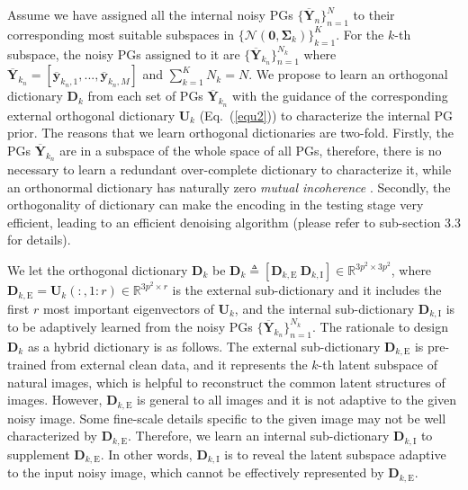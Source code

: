 \documentclass[10pt,twocolumn,letterpaper]{article}
\begin{document}
Assume we have assigned all the internal noisy PGs $\{\mathbf{\overline{Y}}_{n}\}_{n=1}^{N}$ to their corresponding most suitable subspaces in $\{\mathcal{N}(\mathbf{0},\mathbf{\Sigma}_{k})\}_{k=1}^{K}$. For the $k$-th subspace, the noisy PGs assigned to it are $\{\mathbf{\overline{Y}}_{k_{n}}\}_{n=1}^{N_{k}}$ where $\mathbf{\overline{Y}}_{k_{n}}=[\mathbf{\overline{y}}_{k_{n},1},...,\mathbf{\overline{y}}_{k_{n},M}]$ and $\sum_{k=1}^{K}N_{k}=N$. We propose to learn an orthogonal dictionary $\mathbf{D}_{k}$ from each set of PGs $\mathbf{\overline{Y}}_{k_{n}}$ with the guidance of the corresponding external orthogonal dictionary $\mathbf{U}_{k}$ (Eq.\ (\ref{equ2})) to characterize the internal PG prior. The reasons that we learn orthogonal dictionaries are two-fold. Firstly, the PGs $\mathbf{\overline{Y}}_{k_{n}}$ are in a subspace of the whole space of all PGs, therefore, there is no necessary to learn a redundant over-complete dictionary to characterize it, while an orthonormal dictionary has naturally zero \emph{mutual incoherence} \cite{donoho2001uncertainty}. Secondly, the orthogonality of dictionary can make the encoding in the testing stage very efficient, leading to an efficient denoising algorithm (please refer to sub-section 3.3 for details).

We let the orthogonal dictionary $\mathbf{D}_{k}$ be $\mathbf{D}_{k}\triangleq[\mathbf{D}_{k,\text{E}}\ \mathbf{D}_{k,\text{I}}]\in \mathbb{R}^{3p^2\times 3p^2}$, where $\mathbf{D}_{k,\text{E}}=\mathbf{U}_{k}(:,1:r)\in\mathbb{R}^{3p^2\times r}$ is the external sub-dictionary and it includes the first $r$ most important eigenvectors of $\mathbf{U}_{k}$, and the internal sub-dictionary $\mathbf{D}_{k,\text{I}}$ is to be adaptively learned from the noisy PGs $\{\mathbf{\overline{Y}}_{k_{n}}\}_{n=1}^{N_{k}}$. The rationale to design $\mathbf{D}_{k}$ as a hybrid dictionary is as follows. The external sub-dictionary $\mathbf{D}_{k,\text{E}}$ is pre-trained from external clean data, and it represents the $k$-th latent subspace of natural images, which is helpful to reconstruct the common latent structures of images. However, $\mathbf{D}_{k,\text{E}}$ is general to all images and it is not adaptive to the given noisy image. Some fine-scale details specific to the given image may not be well characterized by $\mathbf{D}_{k,\text{E}}$. Therefore, we learn an internal sub-dictionary $\mathbf{D}_{k,\text{I}}$ to supplement $\mathbf{D}_{k,\text{E}}$. In other words, $\mathbf{D}_{k,\text{I}}$ is to reveal the latent subspace adaptive to the input noisy image, which cannot be effectively represented by $\mathbf{D}_{k,\text{E}}$. 
\end{document}
